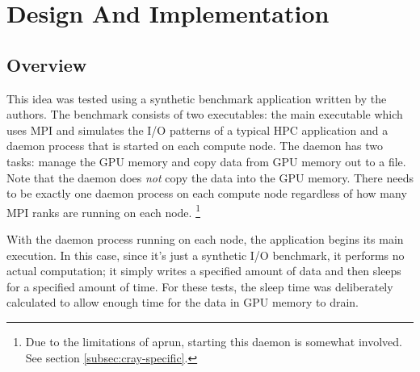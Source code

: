 \section{Design And Implementation}
\label{sec:design}



\subsection{Overview}
\label{subsec:overview}
This idea was tested using a synthetic benchmark application written by the authors.  The benchmark consists of two executables: the main executable which uses MPI and simulates the I/O patterns of a typical HPC application and a daemon process that is started on each compute node.  The daemon has two tasks: manage the GPU memory and copy data from GPU memory out to a file.  Note that the daemon does \emph{not} copy the data into the GPU memory.  There needs to be exactly one daemon process on each compute node regardless of how many MPI ranks are running on each node.  \footnote{Due to the limitations of aprun, starting this daemon is somewhat involved.  See section \ref{subsec:cray-specific}.}

With the daemon process running on each node, the application begins its main execution.  In this case, since it's just a synthetic 
I/O benchmark, it performs no actual computation; it simply writes a specified amount of data and then sleeps for a specified amount of time.  For these tests, the sleep time was deliberately calculated to allow enough time for the data in GPU memory to drain.



